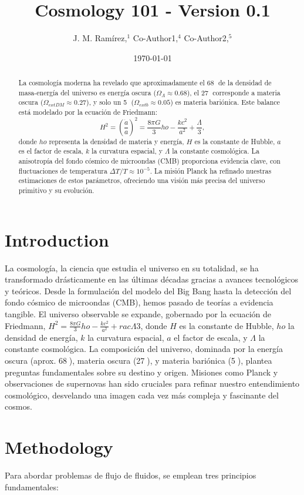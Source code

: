 \documentclass{article}\usepackage{graphicx} \usepackage{amsmath} \usepackage{colortbl}\title{Cosmology 101 - Version 0.1}
\author{J. M. Ram{\'i}rez,$^{1}$ Co-Author1,$^{4}$ Co-Author2,$^{5}$}
\date{\today}
\begin{document}
\maketitle\begin{abstract}
La cosmología moderna ha revelado que aproximadamente el 68 de la densidad de masa-energía del universo es energía oscura ($\Omega_{\Lambda} \approx 0.68$), el 27 corresponde a materia oscura ($\Omega_{	ext{DM}} \approx 0.27$), y solo un 5 ($\Omega_{	ext{b}} \approx 0.05$) es materia bariónica. Este balance está modelado por la ecuación de Friedmann:
\[
H^2 = \left(
\frac{\dot{a}}{a}
\right)^2 = 
\frac{8\pi G}{3}
ho - 
\frac{kc^2}{a^2} + 
\frac{\Lambda}{3},
\]
donde $
ho$ representa la densidad de materia y energía, $H$ es la constante de Hubble, $a$ es el factor de escala, $k$ la curvatura espacial, y $\Lambda$ la constante cosmológica. La anisotropía del fondo cósmico de microondas (CMB) proporciona evidencia clave, con fluctuaciones de temperatura $\Delta T/T \approx 10^{-5}$. La misión Planck ha refinado nuestras estimaciones de estos parámetros, ofreciendo una visión más precisa del universo primitivo y su evolución.
\end{abstract}\section{Introduction}
La cosmología, la ciencia que estudia el universo en su totalidad, se ha transformado drásticamente en las últimas décadas gracias a avances tecnológicos y teóricos. Desde la formulación del modelo del Big Bang hasta la detección del fondo cósmico de microondas (CMB), hemos pasado de teorías a evidencia tangible. El universo observable se expande, gobernado por la ecuación de Friedmann, $H^2 = 
\frac{8\pi G}{3}
ho - 
\frac{kc^2}{a^2} + 
rac{\Lambda}{3}$, donde $H$ es la constante de Hubble, $
ho$ la densidad de energía, $k$ la curvatura espacial, $a$ el factor de escala, y $\Lambda$ la constante cosmológica. La composición del universo, dominada por la energía oscura (aprox. 68), materia oscura (27), y materia bariónica (5), plantea preguntas fundamentales sobre su destino y origen. Misiones como Planck y observaciones de supernovas han sido cruciales para refinar nuestro entendimiento cosmológico, desvelando una imagen cada vez más compleja y fascinante del cosmos.\section{Methodology}
Para abordar problemas de flujo de fluidos, se emplean tres principios fundamentales:
\end{document}

